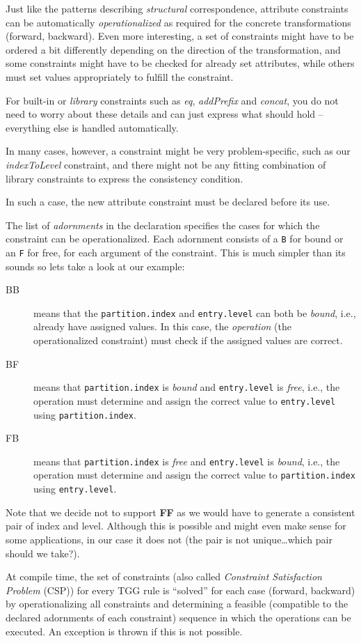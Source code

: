 Just like the patterns describing \emph{structural} correspondence,  attribute constraints can be automatically \emph{operationalized} as required for the concrete transformations (forward, backward).
Even more interesting, a set of constraints might have to be ordered a bit differently depending on the direction of the transformation, and some constraints might have to be checked for already set attributes, while others must set values appropriately to fulfill the constraint.

For built-in or \emph{library} constraints such as \emph{eq}, \emph{addPrefix} and
\emph{concat}, you do not need to worry about these details and can just express what should hold -- 
everything else is handled automatically.

In many cases, however, a constraint might be very problem-specific, such as our \emph{indexToLevel} constraint, and there might not be any fitting combination of library constraints to express the consistency condition.

In such a case, the new attribute constraint must be declared before its use.

The list of \emph{adornments} in the declaration specifies the cases for which the constraint can be operationalized.
Each adornment consists of a \texttt{B} for bound or an \texttt{F} for free, for each argument of the constraint.
This is much simpler than its sounds so lets take a look at our example:
\begin{description}
\item[BB] means that the \texttt{partition.index} and \texttt{entry.level} can both be \emph{bound}, i.e., already have assigned values.
In this case, the \emph{operation} (the operationalized constraint) must check if the assigned values are correct.
\item[BF] means that \texttt{partition.index} is \emph{bound} and \texttt{entry.level} is \emph{free}, i.e., the operation must determine and assign the correct value to \texttt{entry.level} using \texttt{partition.index}.
\item[FB] means that \texttt{partition.index} is \emph{free} and \texttt{entry.level} is \emph{bound}, i.e., the operation must determine and assign the correct value to \texttt{parti\-tion.in\-dex} using \texttt{entry.level}.
\end{description}

Note that we decide not to support \textbf{FF} as we would have to generate a consistent pair of index and level.
Although this is possible and might even make sense for some applications, in our case it does not (the pair is not unique\ldots which pair should we take?).

At compile time, the set of constraints (also called \emph{Constraint Satisfaction Problem} (CSP)) for every TGG rule is ``solved'' for each case (forward, backward) by operationalizing all constraints and determining a feasible (compatible to the declared adornments of each constraint) sequence in which the operations can be executed.
An exception is thrown if this is not possible.
